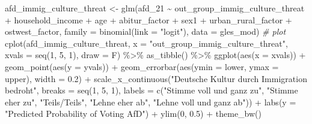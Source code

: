 \documentclass[
]{article}
\newenvironment{Shaded}{\begin{snugshade}}{\end{snugshade}}
\newcommand{\AttributeTok}[1]{\textcolor[rgb]{0.77,0.63,0.00}{#1}}
\newcommand{\CommentTok}[1]{\textcolor[rgb]{0.56,0.35,0.01}{\textit{#1}}}
\newcommand{\DecValTok}[1]{\textcolor[rgb]{0.00,0.00,0.81}{#1}}
\newcommand{\FloatTok}[1]{\textcolor[rgb]{0.00,0.00,0.81}{#1}}
\newcommand{\FunctionTok}[1]{\textcolor[rgb]{0.00,0.00,0.00}{#1}}
\newcommand{\NormalTok}[1]{#1}
\newcommand{\OtherTok}[1]{\textcolor[rgb]{0.56,0.35,0.01}{#1}}
\newcommand{\SpecialCharTok}[1]{\textcolor[rgb]{0.00,0.00,0.00}{#1}}
\newcommand{\StringTok}[1]{\textcolor[rgb]{0.31,0.60,0.02}{#1}}
\begin{document}
\begin{Shaded}
\begin{Highlighting}[]
\NormalTok{afd\_immig\_culture\_threat }\OtherTok{\textless{}{-}} \FunctionTok{glm}\NormalTok{(afd\_21 }\SpecialCharTok{\textasciitilde{}}\NormalTok{ out\_group\_immig\_culture\_threat }\SpecialCharTok{+}\NormalTok{ household\_income }\SpecialCharTok{+}\NormalTok{ age }\SpecialCharTok{+}\NormalTok{ abitur\_factor }\SpecialCharTok{+}\NormalTok{ sex1 }\SpecialCharTok{+}\NormalTok{ urban\_rural\_factor }\SpecialCharTok{+}\NormalTok{ ostwest\_factor, }\AttributeTok{family =} \FunctionTok{binomial}\NormalTok{(}\AttributeTok{link =} \StringTok{"logit"}\NormalTok{), }\AttributeTok{data =}\NormalTok{ gles\_mod)}
\CommentTok{\# plot }
\FunctionTok{cplot}\NormalTok{(afd\_immig\_culture\_threat, }\AttributeTok{x =} \StringTok{"out\_group\_immig\_culture\_threat"}\NormalTok{,}
      \AttributeTok{xvals =} \FunctionTok{seq}\NormalTok{(}\DecValTok{1}\NormalTok{, }\DecValTok{5}\NormalTok{, }\DecValTok{1}\NormalTok{), }\AttributeTok{draw =}\NormalTok{ F) }\SpecialCharTok{\%\textgreater{}\%}
  \FunctionTok{as\_tibble}\NormalTok{() }\SpecialCharTok{\%\textgreater{}\%}
  \FunctionTok{ggplot}\NormalTok{(}\FunctionTok{aes}\NormalTok{(}\AttributeTok{x =}\NormalTok{ xvals)) }\SpecialCharTok{+}
  \FunctionTok{geom\_point}\NormalTok{(}\FunctionTok{aes}\NormalTok{(}\AttributeTok{y =}\NormalTok{ yvals)) }\SpecialCharTok{+}
  \FunctionTok{geom\_errorbar}\NormalTok{(}\FunctionTok{aes}\NormalTok{(}\AttributeTok{ymin =}\NormalTok{ lower, }\AttributeTok{ymax =}\NormalTok{ upper), }\AttributeTok{width =} \FloatTok{0.2}\NormalTok{) }\SpecialCharTok{+}
  \FunctionTok{scale\_x\_continuous}\NormalTok{(}\StringTok{"Deutsche Kultur durch Immigration bedroht"}\NormalTok{, }
                     \AttributeTok{breaks =} \FunctionTok{seq}\NormalTok{(}\DecValTok{1}\NormalTok{, }\DecValTok{5}\NormalTok{, }\DecValTok{1}\NormalTok{), }
                     \AttributeTok{labels =} \FunctionTok{c}\NormalTok{(}\StringTok{"Stimme voll und ganz zu"}\NormalTok{, }\StringTok{"Stimme eher zu"}\NormalTok{, }
                                \StringTok{"Teils/Teils"}\NormalTok{, }\StringTok{"Lehne eher ab"}\NormalTok{, }
                                \StringTok{"Lehne voll und ganz ab"}\NormalTok{)) }\SpecialCharTok{+}
  \FunctionTok{labs}\NormalTok{(}\AttributeTok{y =} \StringTok{"Predicted Probability of Voting AfD"}\NormalTok{) }\SpecialCharTok{+}
  \FunctionTok{ylim}\NormalTok{(}\DecValTok{0}\NormalTok{, }\FloatTok{0.5}\NormalTok{) }\SpecialCharTok{+}
  \FunctionTok{theme\_bw}\NormalTok{() }
\end{Highlighting}
\end{Shaded}
\end{document}
